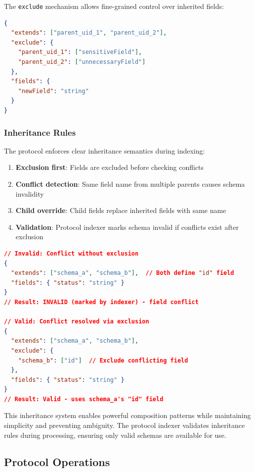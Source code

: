 \documentclass[11pt,a4paper]{article}
\begin{document}
The \texttt{exclude} mechanism allows fine-grained control over inherited fields:

\begin{lstlisting}[language=json,caption={Selective Field Exclusion}]
{
  "extends": ["parent_uid_1", "parent_uid_2"],
  "exclude": {
    "parent_uid_1": ["sensitiveField"],
    "parent_uid_2": ["unnecessaryField"]
  },
  "fields": {
    "newField": "string"
  }
}
\end{lstlisting}

\subsubsection{Inheritance Rules}

The protocol enforces clear inheritance semantics during indexing:

\begin{enumerate}
    \item \textbf{Exclusion first}: Fields are excluded before checking conflicts
    \item \textbf{Conflict detection}: Same field name from multiple parents causes schema invalidity
    \item \textbf{Child override}: Child fields replace inherited fields with same name
    \item \textbf{Validation}: Protocol indexer marks schema invalid if conflicts exist after exclusion
\end{enumerate}

\begin{lstlisting}[language=json,caption={Conflict Resolution Example}]
// Invalid: Conflict without exclusion
{
  "extends": ["schema_a", "schema_b"],  // Both define "id" field
  "fields": { "status": "string" }
}
// Result: INVALID (marked by indexer) - field conflict

// Valid: Conflict resolved via exclusion
{
  "extends": ["schema_a", "schema_b"],
  "exclude": {
    "schema_b": ["id"]  // Exclude conflicting field
  },
  "fields": { "status": "string" }
}
// Result: Valid - uses schema_a's "id" field
\end{lstlisting}

This inheritance system enables powerful composition patterns while maintaining simplicity and preventing ambiguity. The protocol indexer validates inheritance rules during processing, ensuring only valid schemas are available for use.

\subsection{Protocol Operations}
\end{document}

